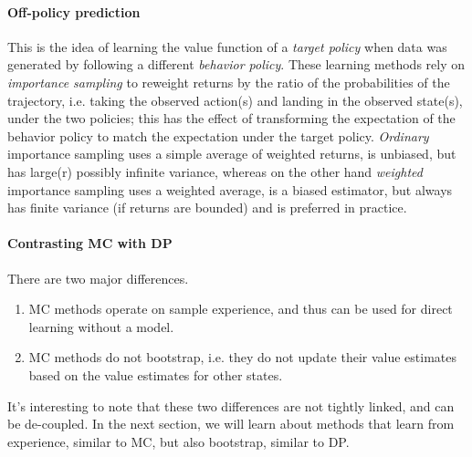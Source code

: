 \documentclass[12pt]{article}
\begin{document}
\paragraph{Off-policy prediction} This is the idea of learning the value function of a \emph{target policy} when data was generated by following a different \emph{behavior policy}. These learning methods rely on \emph{importance sampling} to reweight returns by the ratio of the probabilities of the trajectory, i.e. taking the observed action(s) and landing in the observed state(s), under the two policies; this has the effect of transforming the expectation of the behavior policy to match the expectation under the target policy. \emph{Ordinary} importance sampling uses a simple average of weighted returns, is unbiased, but has large(r) possibly infinite variance, whereas on the other hand \emph{weighted} importance sampling uses a weighted average, is a biased estimator, but always has finite variance (if returns are bounded) and is preferred in practice.

\paragraph{Contrasting MC with DP} There are two major differences.
\begin{enumerate}
  \item MC methods operate on sample experience, and thus can be used for direct     learning without a model.
\item MC methods do not bootstrap, i.e. they do not update their value estimates based on the value estimates for other states.
\end{enumerate}
It's interesting to note that these two differences are not tightly linked, and can be de-coupled. In the next section, we will learn about methods that learn from experience, similar to MC, but also bootstrap, similar to DP.
\end{document}
